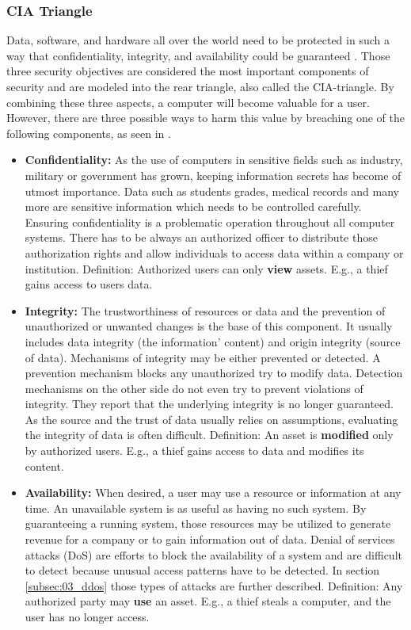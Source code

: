 \subsubsection{CIA Triangle}
Data, software, and hardware all over the world need to be protected in such a way that confidentiality, integrity, and availability could be guaranteed \cite{Pfleeger2014}. Those three security objectives are considered the most important components of security and are modeled into the rear triangle, also called the CIA-triangle. By combining these three aspects, a computer will become valuable for a user. However, there are three possible ways to harm this value by breaching one of the following components, as seen in \cite{Bishop2004}.
\begin{itemize}
  \item \textbf{Confidentiality:} As the use of computers in sensitive fields such as industry, military or government has grown, keeping information secrets has become of utmost importance. Data such as students grades, medical records and many more are sensitive information which needs to be controlled carefully. Ensuring confidentiality is a problematic operation throughout all computer systems. There has to be always an authorized officer to distribute those authorization rights and allow individuals to access data within a company or institution.
        \subitem Definition: Authorized users can only \textbf{view} assets. E.g., a thief gains access to users data.
  \item \textbf{Integrity:} The trustworthiness of resources or data and the prevention of unauthorized or unwanted changes is the base of this component. It usually includes data integrity (the information' content) and origin integrity (source of data). Mechanisms of integrity may be either prevented or detected. A prevention mechanism blocks any unauthorized try to modify data. Detection mechanisms on the other side do not even try to prevent violations of integrity. They report that the underlying integrity is no longer guaranteed. As the source and the trust of data usually relies on assumptions, evaluating the integrity of data is often difficult.
        \subitem Definition: An asset is \textbf{modified} only by authorized users. E.g., a thief gains access to data and modifies its content.
  \item \textbf{Availability:} When desired, a user may use a resource or information at any time. An unavailable system is as useful as having no such system. By guaranteeing a running system, those resources may be utilized to generate revenue for a company or to gain information out of data. Denial of services attacks (DoS) are efforts to block the availability of a system and are difficult to detect because unusual access patterns have to be detected. In section \ref{subsec:03_ddos} those types of attacks are further described.
        \subitem Definition: Any authorized party may \textbf{use} an asset. E.g., a thief steals a computer, and the user has no longer access.
\end{itemize}

